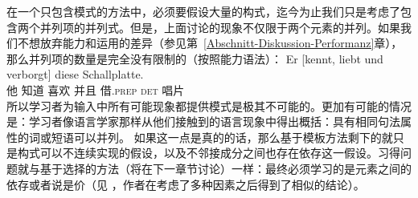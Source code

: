 \zl
在一个只包含模式的方法中，必须要假设大量的构式，迄今为止我们只是考虑了包含两个并列项的并列式。但是，上面讨论的现象不仅限于两个元素的并列。如果我们不想放弃能力和运用的差异（参见第~\ref{Abschnitt-Diskussion-Performanz}章），那么并列项的数量是完全没有限制的（按照能力语法）：
\ea
\gll Er [kennt, liebt und verborgt] diese Schallplatte.\\
	 他 \spacebr{}知道 喜欢 并且 借.\textsc{prep} \textsc{det} 唱片\\
\z
所以学习者为输入中所有可能现象都提供模式是极其不可能的。更加有可能的情况是：学习者像语言学家那样从他们接触到的语言现象中得出概括：具有相同句法属性的词或短语可以并列。
如果这一点是真的的话，那么基于模板方法剩下的就只是构式可以不连续实现的假设，以及不邻接成分之间也存在依存这一假设。习得问题就与基于选择的方法（将在下一章节讨论）一样：最终必须学习的是元素之间的依存或者说是价（见 ，作者在考虑了多种因素之后得到了相似的结论）。%
\indexcxgend

